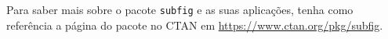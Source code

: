 

\begin{marker}
Para saber mais sobre o pacote {\tt subfig} e as suas aplicações, tenha como referência a página do pacote no CTAN em \url{https://www.ctan.org/pkg/subfig}.
\end{marker}

%
%
%


